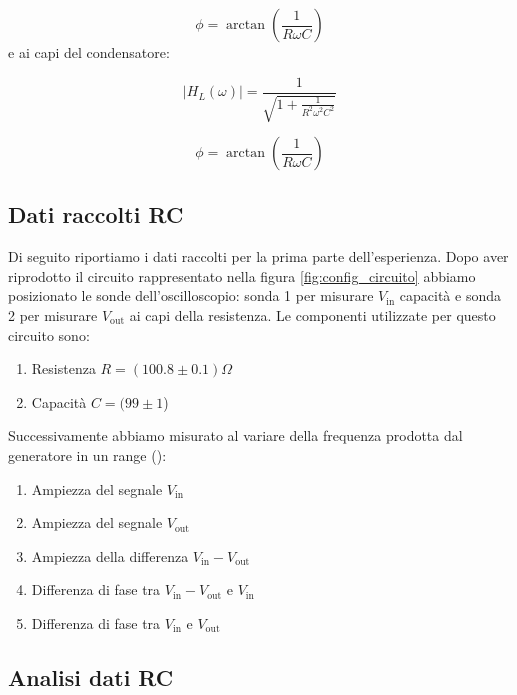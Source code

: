 \documentclass[letterpaper,12pt]{article}
\begin{document}
\begin{equation}
	\label{eq:Fase RC (resistenza)}
	\phi = \arctan\left(\frac{1}{R\omega C}\right)
\end{equation}
e ai capi del condensatore:

\begin{equation}
	\label{eq:Modulo RC (condensatore)}
	|H_L(\omega)| = \frac{1}{\sqrt{1 + \frac{1}{R^2\omega^2C^2}}}
\end{equation}

\begin{equation}
	\label{eq:Fase RC (condensatore)}
	\phi = \arctan\left(\frac{1}{R\omega C}\right)
\end{equation}


\newpage


\subsection{Dati raccolti RC}
Di seguito riportiamo i dati raccolti per la prima parte dell'esperienza.
Dopo aver riprodotto il circuito rappresentato nella figura \ref{fig:config_circuito} abbiamo posizionato le sonde dell'oscilloscopio:
sonda 1 per misurare $V_\text{in}$ capacità e sonda 2 per misurare $V_\text{out}$ ai capi della resistenza.
Le componenti utilizzate per questo circuito sono:

\begin{enumerate}
	\item Resistenza $R = (100.8\pm0.1)\Omega$
	\item Capacità $C = (99\pm1$) 
\end{enumerate}
Successivamente abbiamo misurato al variare della frequenza prodotta dal generatore in un range ():
\begin{enumerate}
	\item Ampiezza del segnale $V_\text{in}$
	\item Ampiezza del segnale $V_\text{out}$
	\item Ampiezza della differenza $V_\text{in} - V_\text{out}$
	\item Differenza di fase tra $V_\text{in} - V_\text{out}$ e $V_\text{in}$
	\item Differenza di fase tra $V_\text{in}$ e $V_\text{out}$
\end{enumerate}



\newpage
\subsection{Analisi dati RC}
\end{document}
